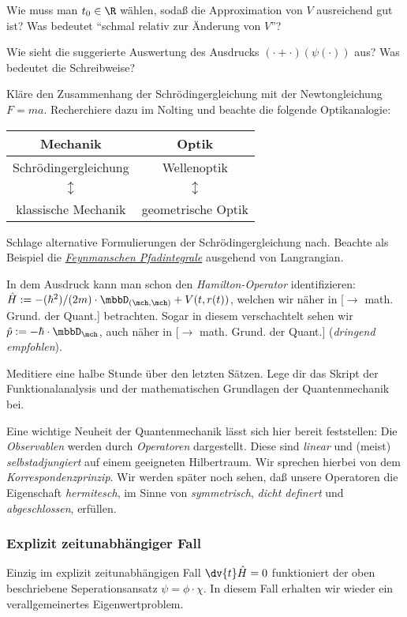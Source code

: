 \documentclass{subfiles}
\begin{document}
        \begin{Aufgabe}
            \nr{} Wie muss man $t_0\in\R$ wählen, sodaß die Approximation von $V$ ausreichend gut ist? Was bedeutet \enquote{schmal relativ zur Änderung von $V$}?

            \nr{} Wie sieht die suggerierte Auswertung des Ausdrucks $(\cdot +\cdot)(\psi(\cdot))$ aus? Was bedeutet die Schreibweise?

            \nr{} Kläre den Zusammenhang der Schrödingergleichung mit der Newtongleichung $F=ma$. Recherchiere dazu im Nolting und beachte die folgende Optikanalogie:
            \begin{table}[H]
                \centering
                \begin{tabular}{c|c}
                    \small{Mechanik} & \small{Optik} \\
                    \hline
                    \small{Schrödingergleichung} & 
                    \small{Wellenoptik} \\
                    \small{$\updownarrow$} & 
                    \small{$\updownarrow$} \\
                    \small{klassische Mechanik} & 
                    \small{geometrische Optik}
                \end{tabular}
            \end{table}

            \nr{} Schlage alternative Formulierungen der Schrödingergleichung nach. Beachte als Beispiel die \href{https://de.wikipedia.org/wiki/Pfadintegral}{\emph{Feynmanschen Pfadintegrale}} ausgehend von Langrangian. 
        \end{Aufgabe}
        In dem Ausdruck kann man schon den \emph{Hamilton-Operator} identifizieren: $\hat H := -(\hbar^2)/(2m)\cdot\mbbD_{(\mch,\mch)}+V(t,r(t))$, welchen wir näher in [$\to$ math. Grund. der Quant.] betrachten. Sogar in diesem verschachtelt sehen wir $\hat p :=-\hbar\cdot\mbbD_\mch$, auch näher in [$\to$ math. Grund. der Quant.] (\textit{dringend empfohlen}). 

        \begin{Aufgabe}
            \nr{} Meditiere eine halbe Stunde über den letzten Sätzen. Lege dir das Skript der Funktionalanalysis und der mathematischen Grundlagen der Quantenmechanik bei. 
        \end{Aufgabe}
        Eine wichtige Neuheit der Quantenmechanik lässt sich hier bereit feststellen: Die \emph{Observablen} werden durch \emph{Operatoren} dargestellt. Diese sind \emph{linear} und (meist) \emph{selbstadjungiert} auf einem geeigneten Hilbertraum. Wir sprechen hierbei von dem \emph{Korrespondenzprinzip}. Wir werden später noch sehen, daß unsere Operatoren die Eigenschaft \emph{hermitesch}, im Sinne von \emph{symmetrisch}, \emph{dicht definert} und \emph{abgeschlossen}, erfüllen. 

        \subsubsection*{Explizit zeitunabhängiger Fall}
            Einzig im explizit zeitunabhängigen Fall $\dv{t}\hat H = 0$ funktioniert der oben beschriebene Seperationsansatz $\psi = \phi\cdot\chi$. In diesem Fall erhalten wir wieder ein verallgemeinertes Eigenwertproblem. 
\end{document}
